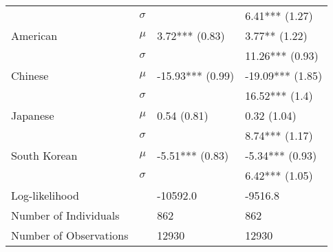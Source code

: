 \begin{tabular}{llll}
                          &  $\sigma$ &                               &                6.41*** (1.27) \\
                 American &     $\mu$ &                3.72*** (0.83) &                 3.77** (1.22) \\
                          &  $\sigma$ &                               &               11.26*** (0.93) \\
                  Chinese &     $\mu$ &              -15.93*** (0.99) &              -19.09*** (1.85) \\
                          &  $\sigma$ &                               &                16.52*** (1.4) \\
                 Japanese &     $\mu$ &                   0.54 (0.81) &                   0.32 (1.04) \\
                          &  $\sigma$ &                               &                8.74*** (1.17) \\
             South Korean &     $\mu$ &               -5.51*** (0.83) &               -5.34*** (0.93) \\
                          &  $\sigma$ &                               &                6.42*** (1.05) \\
    \hline Log-likelihood &           &                      -10592.0 &                       -9516.8 \\
    Number of Individuals &           &                           862 &                           862 \\
   Number of Observations &           &                         12930 &                         12930 \\
\bottomrule
\end{tabular}
